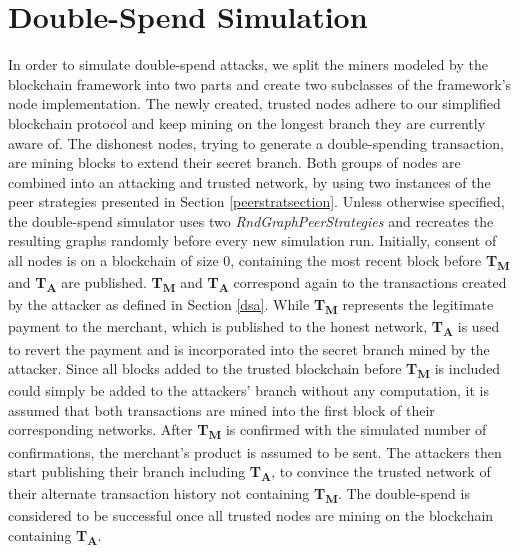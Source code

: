 \documentclass[a4paper,12pt,twoside]{report}
\begin{document}
\section{Double-Spend Simulation} \label{dssim}
In order to simulate double-spend attacks, we split the miners modeled by the blockchain framework into two parts and create two subclasses of the framework's node implementation. The newly created, trusted nodes adhere to our simplified blockchain protocol and keep mining on the longest branch they are currently aware of. The dishonest nodes, trying to generate a double-spending transaction, are mining blocks to extend their secret branch. Both groups of nodes are combined into an attacking and trusted network, by using two instances of the peer strategies presented in Section \ref{peerstratsection}. Unless otherwise specified, the double-spend simulator uses two \textit{RndGraphPeerStrategies} and recreates the resulting graphs randomly before every new simulation run. Initially, consent of all nodes is on a blockchain of size 0, containing the most recent block before \textbf{T\textsubscript{M}} and \textbf{T\textsubscript{A}} are published. \textbf{T\textsubscript{M}} and \textbf{T\textsubscript{A}} correspond again to the transactions created by the attacker as defined in Section \ref{dsa}. While \textbf{T\textsubscript{M}} represents the legitimate payment to the merchant, which is published to the honest network, \textbf{T\textsubscript{A}} is used to revert the payment and is incorporated into the secret branch mined by the attacker. Since all blocks added to the trusted blockchain before \textbf{T\textsubscript{M}} is included could simply be added to the attackers' branch without any computation, it is assumed that both transactions are mined into the first block of their corresponding networks. After \textbf{T\textsubscript{M}} is confirmed with the simulated number of confirmations, the merchant's product is assumed to be sent. The attackers then start publishing their branch including \textbf{T\textsubscript{A}}, to convince the trusted network of their alternate transaction history not containing \textbf{T\textsubscript{M}}. The double-spend is considered to be successful once all trusted nodes are mining on the blockchain containing \textbf{T\textsubscript{A}}.
\end{document}
